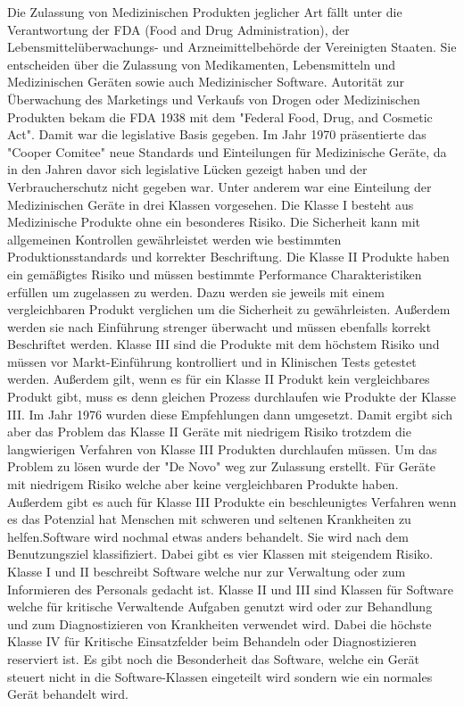 Die Zulassung von Medizinischen Produkten jeglicher Art fällt unter die Verantwortung der FDA (Food and Drug Administration), der Lebensmittelüberwachungs- und Arzneimittelbehörde  der Vereinigten Staaten. Sie entscheiden über die Zulassung von Medikamenten, Lebensmitteln und Medizinischen Geräten sowie auch Medizinischer Software. Autorität zur Überwachung des Marketings und Verkaufs von Drogen oder Medizinischen Produkten bekam die FDA 1938 mit dem "Federal Food, Drug, and Cosmetic Act". Damit war die legislative Basis gegeben. Im Jahr 1970 präsentierte das "Cooper Comitee" neue Standards und Einteilungen für Medizinische Geräte, da in den Jahren davor sich legislative Lücken gezeigt haben und der Verbraucherschutz nicht gegeben war. Unter anderem war eine Einteilung der Medizinischen Geräte in drei Klassen vorgesehen. Die Klasse I besteht aus Medizinische Produkte ohne ein besonderes Risiko. Die Sicherheit kann mit allgemeinen Kontrollen gewährleistet werden wie bestimmten Produktionsstandards und korrekter Beschriftung. Die Klasse II Produkte haben ein gemäßigtes Risiko und müssen bestimmte Performance Charakteristiken erfüllen um zugelassen zu werden. Dazu werden sie jeweils mit einem vergleichbaren Produkt verglichen um die Sicherheit zu gewährleisten. Außerdem werden sie nach Einführung strenger überwacht und müssen ebenfalls korrekt Beschriftet werden. Klasse III sind die Produkte mit dem höchstem Risiko und müssen vor Markt-Einführung kontrolliert und in Klinischen Tests getestet werden. Außerdem gilt, wenn es für ein Klasse II Produkt kein vergleichbares Produkt gibt, muss es denn gleichen Prozess durchlaufen wie Produkte der Klasse III. Im Jahr 1976 wurden diese Empfehlungen dann umgesetzt. Damit ergibt sich aber das Problem das Klasse II Geräte mit niedrigem Risiko trotzdem die langwierigen Verfahren von Klasse III Produkten durchlaufen müssen. Um das Problem zu lösen wurde der "De Novo" weg zur Zulassung erstellt. Für Geräte mit niedrigem Risiko welche aber keine vergleichbaren Produkte haben. Außerdem gibt es auch für Klasse III Produkte ein beschleunigtes Verfahren wenn es das Potenzial hat Menschen mit schweren und seltenen Krankheiten zu helfen.\linebreak Software wird nochmal etwas anders behandelt. Sie wird nach dem Benutzungsziel klassifiziert. Dabei gibt es vier Klassen mit steigendem Risiko. Klasse I und II beschreibt Software welche nur zur Verwaltung oder zum Informieren des Personals gedacht ist. Klasse II und III sind Klassen für Software welche für kritische Verwaltende Aufgaben genutzt wird oder zur Behandlung und zum Diagnostizieren von Krankheiten verwendet wird. Dabei die höchste Klasse IV für Kritische Einsatzfelder beim Behandeln oder Diagnostizieren reserviert ist. Es gibt noch die Besonderheit das Software, welche ein Gerät steuert nicht in die Software-Klassen eingeteilt wird sondern wie ein normales Gerät behandelt wird. \cite{YAEGER2019192}
